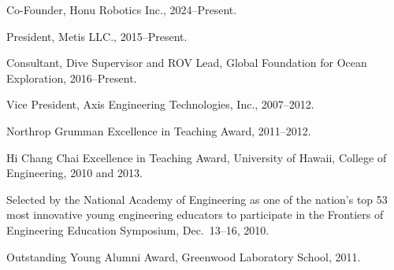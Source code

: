 \begin{cvitems}
  \item Co-Founder, Honu Robotics Inc., 2024--Present.
  \item President, Metis LLC., 2015--Present.
  \item Consultant, Dive Supervisor and ROV Lead, Global Foundation for Ocean Exploration, 2016--Present.
  \item Vice President, Axis Engineering Technologies, Inc., 2007--2012.
\end{cvitems}

\begin{cvitems}
  \item Northrop Grumman Excellence in Teaching Award, 2011--2012.
  \item Hi Chang Chai Excellence in Teaching Award, University of Hawaii, College of Engineering, 2010 and 2013.
  \item Selected by the National Academy of Engineering as one of the nation's top 53 most innovative young engineering educators to participate in the Frontiers of Engineering Education Symposium, Dec.\ 13--16, 2010.
  \item Outstanding Young Alumni Award, Greenwood Laboratory School, 2011.
\end{cvitems}
